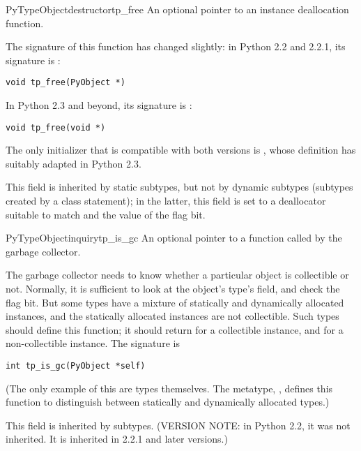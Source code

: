 \begin{cmemberdesc}{PyTypeObject}{destructor}{tp_free}
  An optional pointer to an instance deallocation function.

  The signature of this function has changed slightly: in Python
  2.2 and 2.2.1, its signature is :

\begin{verbatim}
void tp_free(PyObject *)
\end{verbatim}

  In Python 2.3 and beyond, its signature is :

\begin{verbatim}
void tp_free(void *)
\end{verbatim}

  The only initializer that is compatible with both versions is
  , whose definition has suitably adapted in
  Python 2.3.

  This field is inherited by static subtypes, but not by dynamic
  subtypes (subtypes created by a class statement); in the latter,
  this field is set to a deallocator suitable to match
   and the value of the
   flag bit.
\end{cmemberdesc}

\begin{cmemberdesc}{PyTypeObject}{inquiry}{tp_is_gc}
  An optional pointer to a function called by the garbage collector.

  The garbage collector needs to know whether a particular object is
  collectible or not.  Normally, it is sufficient to look at the
  object's type's  field, and check the
   flag bit.  But some types have a
  mixture of statically and dynamically allocated instances, and the
  statically allocated instances are not collectible.  Such types
  should define this function; it should return  for a
  collectible instance, and  for a non-collectible instance.
  The signature is

\begin{verbatim}
int tp_is_gc(PyObject *self)
\end{verbatim}

  (The only example of this are types themselves.  The metatype,
  , defines this function to distinguish between
  statically and dynamically allocated types.)

  This field is inherited by subtypes.  (VERSION NOTE: in Python
  2.2, it was not inherited.  It is inherited in 2.2.1 and later
  versions.)
\end{cmemberdesc}


